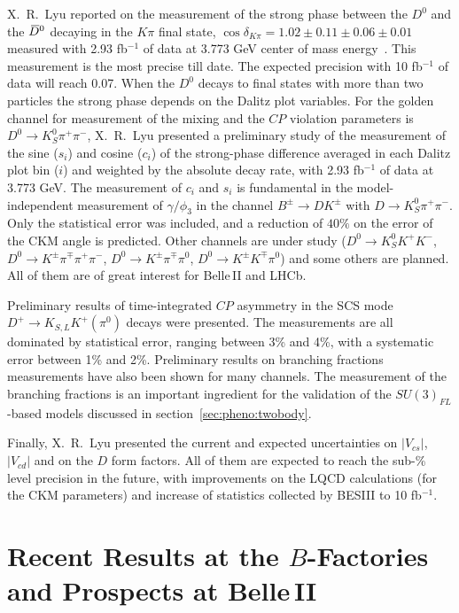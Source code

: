\documentclass{PoS}
\newcommand{\CP}{{\ensuremath{C\!P}}\xspace}
\newcommand{\Dz}{\ensuremath{D^0}\xspace}
\def\Dbar{{\kern 0.2em\overline{\kern -0.2em\ensuremath{D}}{}}\xspace}
\newcommand{\Dzb}{\ensuremath{\Dbar{}^0}\xspace}
\begin{document}
X.~R.~Lyu reported on the measurement of the strong phase between the \Dz and the
\Dzb decaying in the $K\pi$ final state, $\cos\delta_{K\pi} = 1.02 \pm 0.11 \pm0.06 \pm 0.01$ measured with
2.93 fb$^{-1}$ of data at 3.773 GeV center of mass energy~\cite{Ablikim2014227}. This measurement is the most precise till date. The expected precision with 10 fb$^{-1}$ of data will reach 0.07.
When the \Dz decays to final states with more than two particles the
strong phase depends on the Dalitz plot variables. For the golden channel
for measurement of the mixing and the \CP violation
parameters is $\Dz \to K^0_S\pi^+\pi^-$, X.~R.~Lyu
presented a preliminary study of the measurement of the sine ($s_i$) and
cosine ($c_i$) of the strong-phase difference averaged in each Dalitz plot bin ($i$) and weighted by the absolute decay rate, with 2.93
fb$^{-1}$ of data at 3.773 GeV.
The measurement of $c_i$ and $s_i$ is fundamental in the
model-independent measurement of $\gamma/\phi_3$ in the channel
$B^{\pm}\to DK^{\pm}$ with $D\to K^0_S\pi^+\pi^-$.
Only the statistical error was included, and a reduction of $40\%$ on the error of the CKM angle is predicted.
Other channels are under study ($\Dz\to K^0_S K^+
K^-$, $\Dz\to K^{\pm} \pi^{\mp} \pi^+\pi^-$, $\Dz\to K^{\pm} \pi^{\mp}
\pi^0$,  $\Dz\to K^{\pm} K^{\mp} \pi^0$) and some others are planned. All
of them are of great interest for Belle\,II and LHCb.

Preliminary results of time-integrated \CP asymmetry in the SCS mode $D^+ \to K_{S,L} K^+(\pi^0)$
decays were presented. The measurements are
all dominated by statistical error, ranging between 3\% and 4\%,
with a systematic error between 1\% and 2\%. Preliminary results on
branching fractions measurements have also been shown for many channels.
The measurement of the branching fractions is an important ingredient for the
validation of the $SU(3)_{FL}$-based models discussed in section~\ref{sec:pheno:twobody}.

Finally, X.~R.~Lyu presented the current and expected uncertainties on
$|V_{cs}|$, $|V_{cd}|$ and on the $D$ form factors. All of them are expected to reach the sub-\% level precision in the future, with improvements on the LQCD calculations (for the CKM parameters) and increase of
statistics collected by BESIII to 10 fb$^{-1}$.

\section{Recent Results at the $B$-Factories and Prospects at Belle\,II}
\label{sec:BFactories}
%
\end{document}
